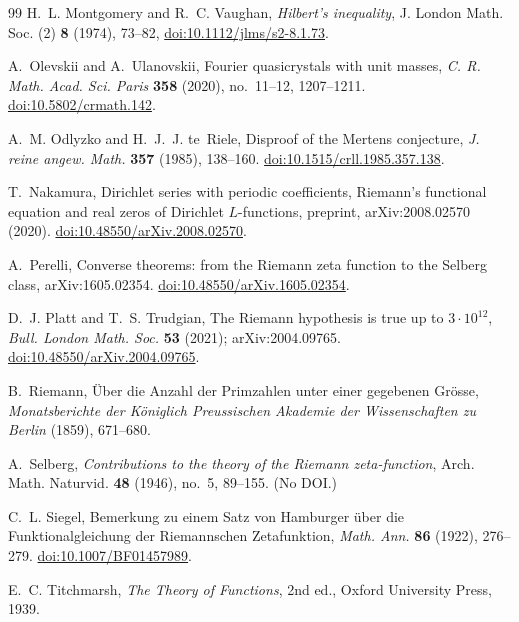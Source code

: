 \documentclass[11pt,reqno]{amsart}
\numberwithin{equation}{section}
\theoremstyle{plain}
\theoremstyle{definition}
\theoremstyle{remark}
\begin{document}
\begin{thebibliography}{99}
H.~L. Montgomery and R.~C. Vaughan, \emph{Hilbert's inequality}, J. London Math. Soc. (2) \textbf{8} (1974), 73--82, \href{https://doi.org/10.1112/jlms/s2-8.1.73}{doi:10.1112/jlms/s2-8.1.73}.

A.~Olevskii and A.~Ulanovskii, Fourier quasicrystals with unit masses, \emph{C. R. Math. Acad. Sci. Paris} \textbf{358} (2020), no.~11--12, 1207--1211.
\href{https://doi.org/10.5802/crmath.142}{doi:10.5802/crmath.142}.

A.~M. Odlyzko and H.~J.~J. te~Riele, Disproof of the Mertens conjecture, \emph{J. reine angew. Math.} \textbf{357} (1985), 138--160.
\href{https://doi.org/10.1515/crll.1985.357.138}{doi:10.1515/crll.1985.357.138}.

T.~Nakamura, Dirichlet series with periodic coefficients, Riemann's functional equation and real zeros of Dirichlet $L$-functions, preprint, arXiv:2008.02570 (2020).
\href{https://doi.org/10.48550/arXiv.2008.02570}{doi:10.48550/arXiv.2008.02570}.

A.~Perelli, Converse theorems: from the Riemann zeta function to the Selberg class, arXiv:1605.02354.
\href{https://doi.org/10.48550/arXiv.1605.02354}{doi:10.48550/arXiv.1605.02354}.

D.~J. Platt and T.~S. Trudgian, The Riemann hypothesis is true up to $3\cdot10^{12}$, \emph{Bull. London Math. Soc.} \textbf{53} (2021); arXiv:2004.09765.
\href{https://doi.org/10.48550/arXiv.2004.09765}{doi:10.48550/arXiv.2004.09765}.

B.~Riemann, \"Uber die Anzahl der Primzahlen unter einer gegebenen Gr\"osse, \emph{Monatsberichte der K\"oniglich Preussischen Akademie der Wissenschaften zu Berlin} (1859), 671--680.

A.~Selberg, \emph{Contributions to the theory of the Riemann zeta-function}, Arch. Math. Naturvid. \textbf{48} (1946), no.~5, 89--155. (No DOI.)

C.~L. Siegel, Bemerkung zu einem Satz von Hamburger \"uber die Funktionalgleichung der Riemannschen Zetafunktion, \emph{Math. Ann.} \textbf{86} (1922), 276--279.
\href{https://doi.org/10.1007/BF01457989}{doi:10.1007/BF01457989}.

E.~C. Titchmarsh, \emph{The Theory of Functions}, 2nd ed., Oxford University Press, 1939.


\end{thebibliography}
\end{document}
